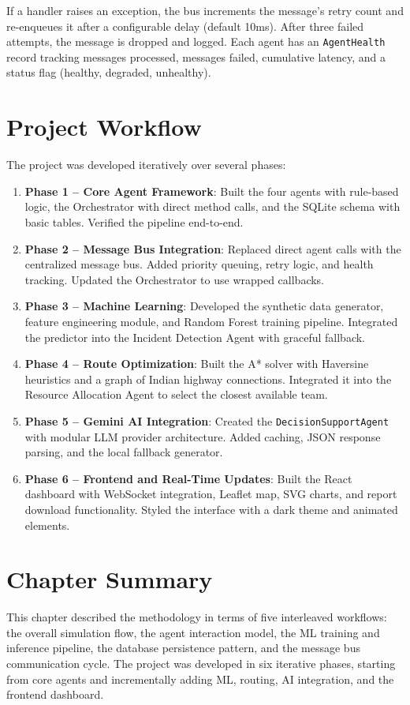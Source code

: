 If a handler raises an exception, the bus increments the message's retry count and re-enqueues it after a configurable delay (default 10ms). After three failed attempts, the message is dropped and logged. Each agent has an \texttt{AgentHealth} record tracking messages processed, messages failed, cumulative latency, and a status flag (healthy, degraded, unhealthy).

\section{Project Workflow}
\label{sec:project_workflow}

The project was developed iteratively over several phases:

\begin{enumerate}[leftmargin=*]
    \item \textbf{Phase 1 -- Core Agent Framework}: Built the four agents with rule-based logic, the Orchestrator with direct method calls, and the SQLite schema with basic tables. Verified the pipeline end-to-end.

    \item \textbf{Phase 2 -- Message Bus Integration}: Replaced direct agent calls with the centralized message bus. Added priority queuing, retry logic, and health tracking. Updated the Orchestrator to use wrapped callbacks.

    \item \textbf{Phase 3 -- Machine Learning}: Developed the synthetic data generator, feature engineering module, and Random Forest training pipeline. Integrated the predictor into the Incident Detection Agent with graceful fallback.

    \item \textbf{Phase 4 -- Route Optimization}: Built the A* solver with Haversine heuristics and a graph of Indian highway connections. Integrated it into the Resource Allocation Agent to select the closest available team.

    \item \textbf{Phase 5 -- Gemini AI Integration}: Created the \texttt{DecisionSupportAgent} with modular LLM provider architecture. Added caching, JSON response parsing, and the local fallback generator.

    \item \textbf{Phase 6 -- Frontend and Real-Time Updates}: Built the React dashboard with WebSocket integration, Leaflet map, SVG charts, and report download functionality. Styled the interface with a dark theme and animated elements.
\end{enumerate}

\section{Chapter Summary}
\label{sec:ch3_summary}

This chapter described the methodology in terms of five interleaved workflows: the overall simulation flow, the agent interaction model, the ML training and inference pipeline, the database persistence pattern, and the message bus communication cycle. The project was developed in six iterative phases, starting from core agents and incrementally adding ML, routing, AI integration, and the frontend dashboard.
